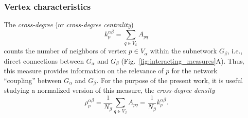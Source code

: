 			\subsubsection{Vertex characteristics}
			The \textit{cross-degree} (or \textit{cross-degree centrality})
\begin{equation}
{k}_p^{\alpha\beta} = \sum_{q \in V_\beta} A_{pq}
\label{eq:degree_cross}
\end{equation}
counts the number of neighbors of vertex $p \in V_\alpha$ within the subnetwork $G_\beta$, i.e., direct connections between $G_\alpha$ and $G_\beta$ (Fig.~\ref{fig:interacting_measures}A). Thus, this measure provides information on the relevance of $p$ for the network ``coupling'' between $G_\alpha$ and $G_\beta$. For the purpose of the present work, it is useful studying a normalized version of this measure, the \textit{cross-degree density}
\begin{equation}
{\rho}_p^{\alpha\beta} = \frac{1}{N_\beta} \sum_{q \in V_\beta} A_{pq} = \frac{1}{N_\beta} {k}_p^{\alpha\beta}.
\label{eq:locrho_cross}
\end{equation}

